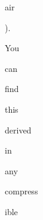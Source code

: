\documentclass[arwidth=200mm]{standalone}
\begin{document}
{{\colorbox[RGB]{255,254,254}{\strut  air}\colorbox[RGB]{255,254,254}{\strut ).} \colorbox[RGB]{255,254,254}{\strut  You} \colorbox[RGB]{255,254,254}{\strut  can} \colorbox[RGB]{255,254,254}{\strut  find} \colorbox[RGB]{255,254,254}{\strut  this} \colorbox[RGB]{255,254,254}{\strut  derived} \colorbox[RGB]{255,254,254}{\strut  in} \colorbox[RGB]{255,254,254}{\strut  any} \colorbox[RGB]{255,254,254}{\strut  compress}\colorbox[RGB]{255,254,254}{\strut ible}}}
\end{document}
